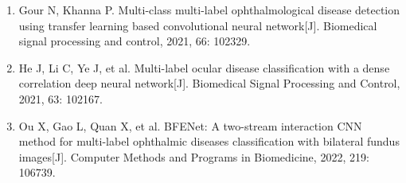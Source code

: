 \begin{enumerate}
  \protect{}\label{_Ref213949409}{}Pachade S, Porwal P, Thulkar D, et al. Retinal fundus multi-disease image dataset (rfmid): A dataset for multi-disease detection research{[}J{]}. Data, 2021, 6(2): 14.
\item
  \protect{}\label{_Ref214903299}{}Gour N, Khanna P. Multi-class multi-label ophthalmological disease detection using transfer learning based convolutional neural network{[}J{]}. Biomedical signal processing and control, 2021, 66: 102329.
\item
  \protect{}\label{_Ref214903312}{}He J, Li C, Ye J, et al. Multi-label ocular disease classification with a dense correlation deep neural network{[}J{]}. Biomedical Signal Processing and Control, 2021, 63: 102167.
\item
  \protect{}\label{_Ref214903327}{}Ou X, Gao L, Quan X, et al. BFENet: A two-stream interaction CNN method for multi-label ophthalmic diseases classification with bilateral fundus images{[}J{]}. Computer Methods and Programs in Biomedicine, 2022, 219: 106739.
\end{enumerate}
